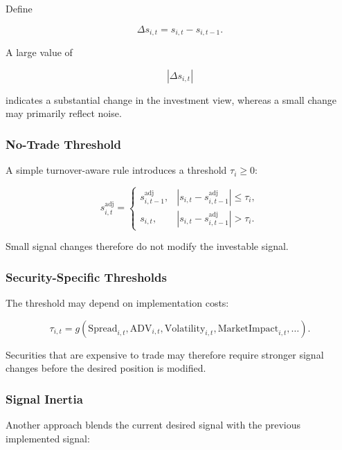 \documentclass[11pt,a4paper]{article}
\begin{document}
Define

\begin{equation}
\Delta s_{i,t}
=
s_{i,t}
-
s_{i,t-1}.
\end{equation}

A large value of

\begin{equation}
|\Delta s_{i,t}|
\end{equation}

indicates a substantial change in the investment view, whereas a small change
may primarily reflect noise.


\subsubsection{No-Trade Threshold}

A simple turnover-aware rule introduces a threshold $\tau_i\geq0$:

\begin{equation}
\boxed{
s_{i,t}^{\mathrm{adj}}
=
\begin{cases}
s_{i,t-1}^{\mathrm{adj}},
&
|s_{i,t}-s_{i,t-1}^{\mathrm{adj}}|
\leq
\tau_i,
\\[0.15cm]
s_{i,t},
&
|s_{i,t}-s_{i,t-1}^{\mathrm{adj}}|
>
\tau_i.
\end{cases}
}
\end{equation}

Small signal changes therefore do not modify the investable signal.


\subsubsection{Security-Specific Thresholds}

The threshold may depend on implementation costs:

\begin{equation}
\boxed{
\tau_{i,t}
=
g
\left(
\mathrm{Spread}_{i,t},
\mathrm{ADV}_{i,t},
\mathrm{Volatility}_{i,t},
\mathrm{MarketImpact}_{i,t},
\ldots
\right).
}
\end{equation}

Securities that are expensive to trade may therefore require stronger signal
changes before the desired position is modified.


\subsubsection{Signal Inertia}

Another approach blends the current desired signal with the previous
implemented signal:
\end{document}

